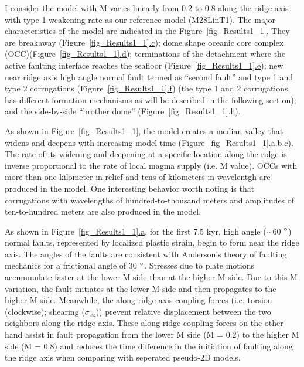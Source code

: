 I consider the model with M varies linearly from 0.2 to 0.8 along the ridge axis with type 1 weakening rate as our reference model (M28LinT1). The major characteristics of the model are indicated in the Figure~\hyperref[fig_Results1_1]{\ref{fig_Results1_1}}. They are breakaway (Figure~\hyperref[fig_Results1_1]{\ref{fig_Results1_1}.c}); dome shape oceanic core complex (OCC)(Figure~\hyperref[fig_Results1_1]{\ref{fig_Results1_1}.d}); terminations of the detachment where the active faulting interface reaches the seafloor (Figure~\hyperref[fig_Results1_1]{\ref{fig_Results1_1}.e}); new near ridge axis high angle normal fault termed as ``second fault'' and type 1 and type 2 corrugations (Figure~\hyperref[fig_Results1_1]{\ref{fig_Results1_1}.f}) (the type 1 and 2 corrugations has different formation mechanisms as will be described in the following section); and the side-by-side ``brother dome'' (Figure~\hyperref[fig_Results1_1]{\ref{fig_Results1_1}.h}).    

As shown in Figure~\hyperref[fig_Results1_1]{\ref{fig_Results1_1}}, the model creates a median valley that widens and deepens with increasing model time (Figure~\hyperref[fig_Results1_1]{\ref{fig_Results1_1}.a.b.c}). The rate of its widening and deepening at a specific location along the ridge is inverse proportional to the rate of local magma supply (i.e. M value). OCCs with more than one kilometer in relief and tens of kilometers in wavelentgh are produced in the model. One interesting behavior worth noting is that corrugations with wavelengths of hundred-to-thousand meters and amplitudes of ten-to-hundred meters are also produced in the model.

As shown in Figure~\hyperref[fig_Results1_1]{\ref{fig_Results1_1}.a}, for the first 7.5 kyr, high angle ($\sim$60 $\degree$) normal faults, represented by localized plastic strain, begin to form near the ridge axis. The angles of the faults are consistent with  Anderson's theory of faulting mechanics for a frictional angle of 30 $\degree$. Stresses due to plate motions accummulate faster at the lower M side than at the higher M side. Due to this M variation, the fault initiates at the lower M side and then propagates to the higher M side. Meanwhile, the along ridge axis coupling forces (i.e. torsion (clockwise); shearing ($\sigma_{xz}$)) prevent relative displacement between the two neighbors along the ridge axis. These along ridge coupling forces on the other hand assist in fault propagation from the lower M side (M = 0.2) to the higher M side (M = 0.8) and reduces the time difference in the initiation of faulting along the ridge axis when comparing with seperated pseudo-2D models.

